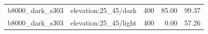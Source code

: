 \begin{longtable}{l>{\raggedright\arraybackslash}p{.42\linewidth}rrr}
b8000\_\allowbreak{}dark\_\allowbreak{}s303 & %
elevation:25\_\allowbreak{}45/dark & %
400 & %
85.00 & %
99.37 \\ %

b8000\_\allowbreak{}dark\_\allowbreak{}s303 & %
elevation:25\_\allowbreak{}45/light & %
400 & %
0.00 & %
57.26 \\ %


\end{longtable}
